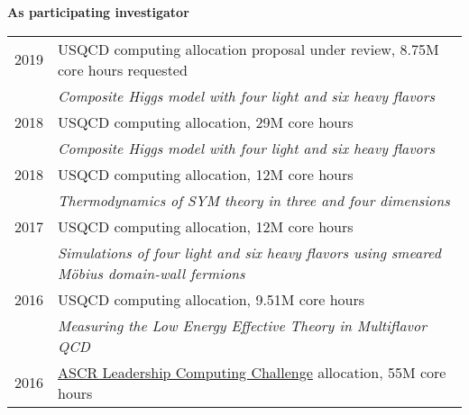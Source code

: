\begin{spacelistout}
  \vspace{18 pt}
  \item {\large \bfseries As participating investigator} \\[10 pt]
    \begin{tabular}[t]{cl}
      2019 & USQCD computing allocation proposal under review, 8.75M core hours requested                                                                      \\ %
           & \textit{Composite Higgs model with four light and six heavy flavors}                                                                              \\[6 pt]
      2018 & USQCD computing allocation, 29M core hours                                                                                                        \\ %
           & \textit{Composite Higgs model with four light and six heavy flavors}                                                                              \\[6 pt]
      2018 & USQCD computing allocation, 12M core hours                                                                                                        \\ %
           & \textit{Thermodynamics of SYM theory in three and four dimensions}                                                                                \\[6 pt]
      2017 & USQCD computing allocation, 12M core hours                                                                                                        \\ %
           & \textit{Simulations of four light and six heavy flavors using smeared M\"obius domain-wall fermions}                                              \\[6 pt]
      2016 & USQCD computing allocation, 9.51M core hours                                                                                                      \\ %
           & \textit{Measuring the Low Energy Effective Theory in Multiflavor QCD}                                                                             \\[6 pt]
      2016 & \href{https://science.energy.gov/ascr/facilities/accessing-ascr-facilities/alcc/}{ASCR Leadership Computing Challenge} allocation, 55M core hours \\ %

\end{tabular}
\end{spacelistout}

